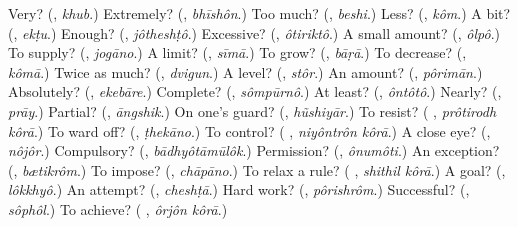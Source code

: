 \begin{tcolorbox}[breakable,colback=teal!4,colframe=teal!35!black,title={Before you move on}]
Very? (\textbf{}, \emph{khub}.) Extremely? (\textbf{}, \emph{bhīshôn}.) Too much? (\textbf{}, \emph{beshi}.) Less? (\textbf{}, \emph{kôm}.) A bit? (\textbf{}, \emph{ekṭu}.) Enough? (\textbf{}, \emph{jôtheshṭô}.) Excessive? (\textbf{}, \emph{ôtiriktô}.) A small amount? (\textbf{}, \emph{ôlpô}.) To supply? (\textbf{}, \emph{jogāno}.) A limit? (\textbf{}, \emph{sīmā}.) To grow? (\textbf{}, \emph{bāṛā}.) To decrease? (\textbf{}, \emph{kômā}.) Twice as much? (\textbf{}, \emph{dvigun}.) A level? (\textbf{}, \emph{stôr}.) An amount? (\textbf{}, \emph{pôrimān}.) Absolutely? (\textbf{}, \emph{ekebāre}.) Complete? (\textbf{}, \emph{sômpūrnô}.) At least? (\textbf{}, \emph{ôntôtô}.) Nearly? (\textbf{}, \emph{prāy}.) Partial? (\textbf{}, \emph{āngshik}.) On one's guard? (\textbf{}, \emph{hũshiyār}.) To resist? (\textbf{ }, \emph{prôtirodh kôrā}.) To ward off? (\textbf{}, \emph{ṭhekāno}.) To control? (\textbf{ }, \emph{niyôntrôn kôrā}.) A close eye? (\textbf{}, \emph{nôjôr}.) Compulsory? (\textbf{}, \emph{bādhyôtāmūlôk}.) Permission? (\textbf{}, \emph{ônumôti}.) An exception? (\textbf{}, \emph{bætikrôm}.) To impose? (\textbf{}, \emph{chāpāno}.) To relax a rule? (\textbf{ }, \emph{shithil kôrā}.) A goal? (\textbf{}, \emph{lôkkhyô}.) An attempt? (\textbf{}, \emph{cheshṭā}.) Hard work? (\textbf{}, \emph{pôrishrôm}.) Successful? (\textbf{}, \emph{sôphôl}.) To achieve? (\textbf{ }, \emph{ôrjôn kôrā}.)
\end{tcolorbox}
